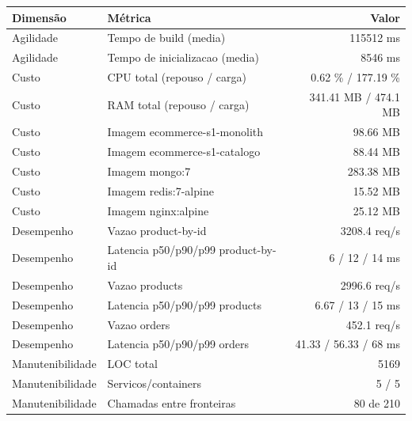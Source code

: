 \begin{quadro}[htb]
  \centering
  \caption{Métricas (ecommerce, capacidade-negocio, snapshot-1).}
  \label{qua:metricas-ecommerce-capacidade-negocio-snapshot-1}
  \renewcommand{\arraystretch}{1.15}
  \begin{tabular}{|l|l|r|}
    \hline
    \textbf{Dimensão} & \textbf{Métrica} & \textbf{Valor} \\
    \hline
    Agilidade & Tempo de build (media) & 115512 ms \\ \hline
    Agilidade & Tempo de inicializacao (media) & 8546 ms \\ \hline
    Custo & CPU total (repouso / carga) & 0.62 \% / 177.19 \% \\ \hline
    Custo & RAM total (repouso / carga) & 341.41 MB / 474.1 MB \\ \hline
    Custo & Imagem ecommerce-s1-monolith & 98.66 MB \\ \hline
    Custo & Imagem ecommerce-s1-catalogo & 88.44 MB \\ \hline
    Custo & Imagem mongo:7 & 283.38 MB \\ \hline
    Custo & Imagem redis:7-alpine & 15.52 MB \\ \hline
    Custo & Imagem nginx:alpine & 25.12 MB \\ \hline
    Desempenho & Vazao product-by-id & 3208.4 req/s \\ \hline
    Desempenho & Latencia p50/p90/p99 product-by-id & 6 / 12 / 14 ms \\ \hline
    Desempenho & Vazao products & 2996.6 req/s \\ \hline
    Desempenho & Latencia p50/p90/p99 products & 6.67 / 13 / 15 ms \\ \hline
    Desempenho & Vazao orders & 452.1 req/s \\ \hline
    Desempenho & Latencia p50/p90/p99 orders & 41.33 / 56.33 / 68 ms \\ \hline
    Manutenibilidade & LOC total & 5169 \\ \hline
    Manutenibilidade & Servicos/containers & 5 / 5 \\ \hline
    Manutenibilidade & Chamadas entre fronteiras & 80 de 210 \\ \hline
  \end{tabular}
\end{quadro}
